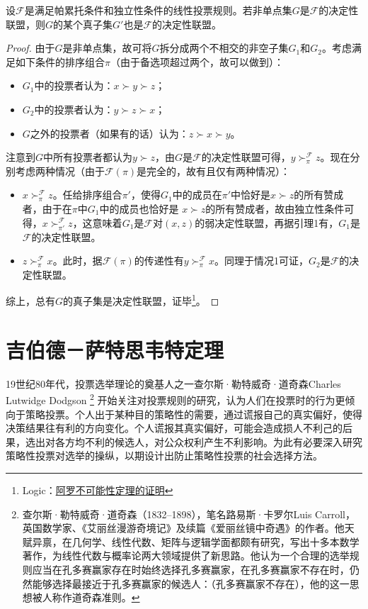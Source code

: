 \begin{lemma}[收缩引理]
设$\mathcal F$是满足帕累托条件和独立性条件的线性投票规则。若非单点集$G$是$\mathcal F$的决定性联盟，则$G$的某个真子集$G'$也是$\mathcal F$的决定性联盟。
\end{lemma}
\begin{proof}
由于$G$是非单点集，故可将$G$拆分成两个不相交的非空子集$G_1$和$G_2$。考虑满足如下条件的排序组合$\pi$（由于备选项超过两个，故可以做到）：
\begin{itemize}
  \item $G_1$中的投票者认为：$x\succ y\succ z$；
  \item $G_2$中的投票者认为：$y\succ z\succ x$；
  \item $G$之外的投票者（如果有的话）认为：$z\succ x\succ y$。
\end{itemize}
注意到$G$中所有投票者都认为$y\succ z$，由$G$是$\mathcal F$的决定性联盟可得，$y\succ_\pi^{\mathcal F} z$。现在分别考虑两种情况（由于$\mathcal F(\pi)$是完全的，故有且仅有两种情况）：
\begin{itemize}
  \item $x\succ_\pi^{\mathcal F}z$。任给排序组合$\pi'$，使得$G_1$中的成员在$\pi'$中恰好是$x\succ z$的所有赞成者，由于在$\pi$中$G_1$中的成员也恰好是 $x\succ z$的所有赞成者，故由独立性条件可得，$x\succ_{\pi'}^{\mathcal F} z$，这意味着$G_1$是$\mathcal F$对$(x,z)$的弱决定性联盟，再据引理1有，$G_1$是$\mathcal F$的决定性联盟。
  \item $z\succ_\pi^{\mathcal F}x$。此时，据$\mathcal F(\pi)$的传递性有$y\succ_\pi^{\mathcal F}x$。同理于情况1可证，$G_2$是$\mathcal F$的决定性联盟。
\end{itemize}
综上，总有$G$的真子集是决定性联盟，证毕\footnote{Logic：\href{http://www.cnblogs.com/ilogic/archive/2012/08/05/proof\_arrow.html}{阿罗不可能性定理的证明}}。
\end{proof}

\section{吉伯德－萨特思韦特定理}
19世纪80年代，投票选举理论的奠基人之一查尔斯·勒特威奇·道奇森Charles Lutwidge Dodgson
\footnote{查尔斯·勒特威奇·道奇森（1832--1898），笔名路易斯·卡罗尔Luis Carroll，英国数学家、《艾丽丝漫游奇境记》及续篇《爱丽丝镜中奇遇》的作者。他天赋异禀，在几何学、线性代数、矩阵与逻辑学面都颇有研究，写出十多本数学著作，为线性代数与概率论两大领域提供了新思路。他认为一个合理的选举规则应当在孔多赛赢家存在时始终选择孔多赛赢家，在孔多赛赢家不存在时，仍然能够选择最接近于孔多赛赢家的候选人：（孔多赛赢家不存在），他的这一思想被人称作道奇森准则。}
开始关注对投票规则的研究，认为人们在投票时的行为更倾向于策略投票。个人出于某种目的策略性的需要，通过谎报自己的真实偏好，使得决策结果往有利的方向变化。个人谎报其真实偏好，可能会造成损人不利己的后果，选出对各方均不利的候选人，对公众权利产生不利影响。为此有必要深入研究策略性投票对选举的操纵，以期设计出防止策略性投票的社会选择方法。

